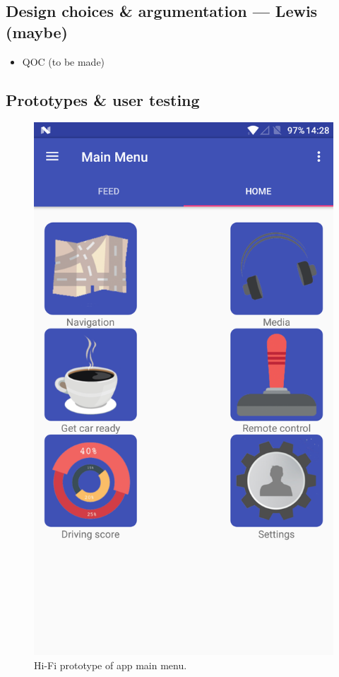 \documentclass{article}
\begin{document}
\subsection{Design choices \& argumentation --- Lewis (maybe)}\label{ssec:app-design}
\begin{itemize}
  \item QOC (to be made)
\end{itemize}

\subsection{Prototypes \& user testing}\label{ssec:app-prototypes-testing}
\begin{figure}[H]
  \centering
  \includegraphics[scale=0.25]{main-menu}
  \caption{Hi-Fi prototype of app main menu.}\label{main-menu}
\end{figure}
\end{document}
